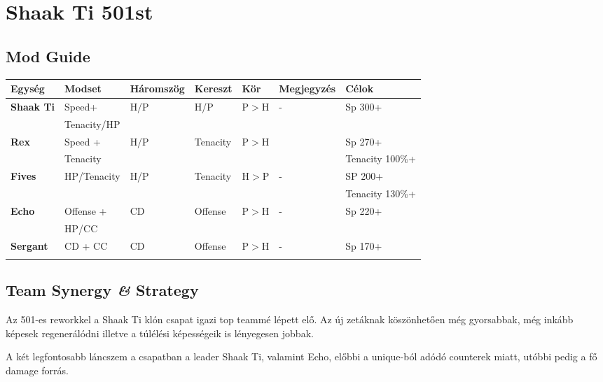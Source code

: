 \documentclass[11pt]{report}
\begin{document}

\chapter{Shaak Ti 501st}
\section{Mod Guide}
\begin{center}
    \begin{tabular}{|l | l | l | l | l | l | l |}
        \hline
        Egység & Modset & Háromszög & Kereszt & Kör & Megjegyzés & Célok\\ \hline
        \textbf{Shaak Ti} & Speed+ & H/P & H/P & P$>$H & - & Sp 300+\\
        & Tenacity/HP &  &  &  &  & \\ \hline
        \textbf{Rex} & Speed + & H/P & Tenacity & P$>$H &  & Sp 270+\\
        & Tenacity &  &  &  &  & Tenacity 100\%+\\ \hline
        \textbf{Fives} & HP/Tenacity & H/P & Tenacity & H$>$P & - & SP 200+\\
        &  &  &  &  &  & Tenacity 130\%+\\ \hline
        \textbf{Echo} & Offense + & CD & Offense & P$>$H & - & Sp 220+\\
        & HP/CC &  &  &  &  & \\ \hline
        \textbf{Sergant} & CD + CC & CD & Offense & P$>$H & - & Sp 170+\\
        &  &  &  &  &  & \\ \hline
    \end{tabular}
\end{center}
\section{Team Synergy \textit{\&} Strategy}
Az 501-es reworkkel a Shaak Ti klón csapat igazi top teammé lépett elő. Az új zetáknak köszönhetően még gyorsabbak, még inkább képesek regenerálódni illetve a túlélési képességeik is lényegesen jobbak.\par
A két legfontosabb láncszem a csapatban a leader Shaak Ti, valamint Echo, előbbi a unique-ból adódó counterek miatt, utóbbi pedig a fő damage forrás.

\end{document}
